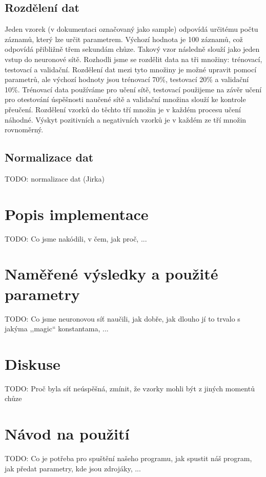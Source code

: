 \documentclass[a4paper, 10pt]{article}
\begin{document}
    \subsection{Rozdělení dat}
      \begin{multicols}{2}
        Jeden vzorek (v dokumentaci označovaný jako sample) odpovídá určitému počtu záznamů, který lze určit parametrem. Výchozí hodnota je 100 záznamů, což odpovídá přibližně třem sekundám chůze. Takový vzor následně slouží jako jeden vstup do neuronové sítě.
        Rozhodli jsme se rozdělit data na tři množiny: trénovací, testovací a validační. Rozdělení dat mezi tyto množiny je možné upravit pomocí parametrů, ale výchozí hodnoty jsou trénovací 70\%, testovací 20\% a validační 10\%. Trénovací data používáme pro učení sítě, testovací použijeme na závěr učení pro otestování úspěšnosti naučené sítě a validační množina slouží ke kontrole přeučení. Rozdělení vzorků do těchto tří množin je v každém procesu učení náhodné. Výskyt pozitivních a negativních vzorků je v každém ze tří množin rovnoměrný.
      \end{multicols}
      
    \subsection{Normalizace dat}
      \begin{multicols}{2}
      TODO: normalizace dat (Jirka)
      \end{multicols}
\section{Popis implementace}
  \begin{multicols}{2}
  TODO: Co jsme nakódili, v čem, jak proč, ...
  \end{multicols}
\section{Naměřené výsledky a použité parametry}
  \begin{multicols}{2}
  TODO: Co jsme neuronovou síť naučili, jak dobře, jak dlouho jí to trvalo s jakýma ,,magic`` konstantama, ...
  \end{multicols}
\section{Diskuse}
  \begin{multicols}{2}
    TODO: Proč byla síť neúspěšná, zmínit, že vzorky mohli být z jiných momentů chůze
  \end{multicols}
\appendix
\section{Návod na použití}
  TODO: Co je potřeba pro spuštění našeho programu, jak spustit náš program, jak předat parametry, kde jsou zdrojáky, ...


\printbibliography
\end{document}
